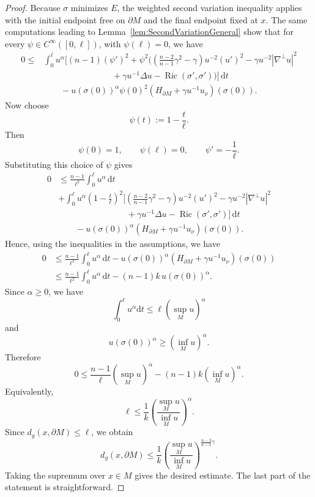 \documentclass[12pt,a4paper,reqno]{amsart}
\theoremstyle{definition}
\renewcommand{\leq}{\leqslant}
\renewcommand{\geq}{\geqslant}
\DeclareMathOperator{\Ric}{Ric}
\begin{document}
{\begin{proof}
Because $\sigma$ minimizes $E$, the weighted second variation inequality
applies with the initial endpoint free on $\partial M$ and the final endpoint
fixed at $x$. The same computations leading to Lemma~\ref{lem:SecondVariationGeneral} show that for every $\psi\in C^\infty([0,\ell])$, with $\psi(\ell)=0$, we have 
\[
\begin{aligned}
0\leq
&\int_0^\ell u^\alpha
\Bigg[
(n-1)(\psi')^2
+\psi^2
\Bigg(
\left(\frac{n-2}{n-1}\gamma^2-\gamma\right)u^{-2}(u')^2
-\gamma u^{-2}|\nabla^\perp u|^2  \\
&\qquad\qquad\qquad\qquad
+\gamma u^{-1}\Delta u-\Ric(\sigma',\sigma')
\Bigg)
\Bigg]\,\mathrm{d}t \\
&\qquad
-u(\sigma(0))^\alpha\psi(0)^2
\left(
H_{\partial M}+\gamma u^{-1}u_\nu
\right)(\sigma(0)).
\end{aligned}
\]
Now choose
\[
\psi(t):=1-\frac{t}{\ell}.
\]
Then
\[
\psi(0)=1,\qquad \psi(\ell)=0,\qquad \psi'=-\frac1\ell.
\]
Substituting this choice of $\psi$ gives
\[
\begin{aligned}
0&\leq
\frac{n-1}{\ell^2}\int_0^\ell u^\alpha\,\mathrm{d}t  \\
&+\int_0^\ell u^\alpha
\left(1-\frac{t}{\ell}\right)^2
\Bigg[
\left(\frac{n-2}{n-1}\gamma^2-\gamma\right)u^{-2}(u')^2
-\gamma u^{-2}|\nabla^\perp u|^2  \\
&\qquad\qquad\qquad\qquad
+\gamma u^{-1}\Delta u-\Ric(\sigma',\sigma')
\Bigg]\,\mathrm{d}t \\
&\qquad
-u(\sigma(0))^\alpha
\left(
H_{\partial M}+\gamma u^{-1}u_\nu
\right)(\sigma(0)).
\end{aligned}
\]
Hence, using the inequalities in the assumptions, we have
\[
\begin{aligned}
0
&\leq
\frac{n-1}{\ell^2}\int_0^\ell u^\alpha\,\mathrm{d}t
-u(\sigma(0))^\alpha
\left(
H_{\partial M}+\gamma u^{-1}u_\nu
\right)(\sigma(0)) \\
&\leq
\frac{n-1}{\ell^2}\int_0^\ell u^\alpha\,\mathrm{d}t
-(n-1)k\,u(\sigma(0))^\alpha.
\end{aligned}
\]
Since $\alpha\geq 0$, we have
\[
\int_0^\ell u^\alpha\mathrm{d}t\leq \ell(\sup_M u)^\alpha
\]
and
\[
u(\sigma(0))^\alpha\geq (\inf_M u)^\alpha.
\]
Therefore
\[
0
\leq
\frac{n-1}{\ell}(\sup_M u)^\alpha
-(n-1)k(\inf_M u)^\alpha.
\]
Equivalently,
\[
\ell
\leq
\frac1k
\left(
\frac{\sup_M u}{\inf_M u}
\right)^\alpha.
\]
Since $d_g(x,\partial M)\leq \ell$, we obtain
\[
d_g(x,\partial M)
\leq
\frac1k
\left(
\frac{\sup_M u}{\inf_M u}
\right)^{\frac{n-3}{n-1}\gamma}.
\]
Taking the supremum over $x\in M$ gives the desired estimate. The last part of the statement is straightforward.

\end{proof}}
\end{document}
